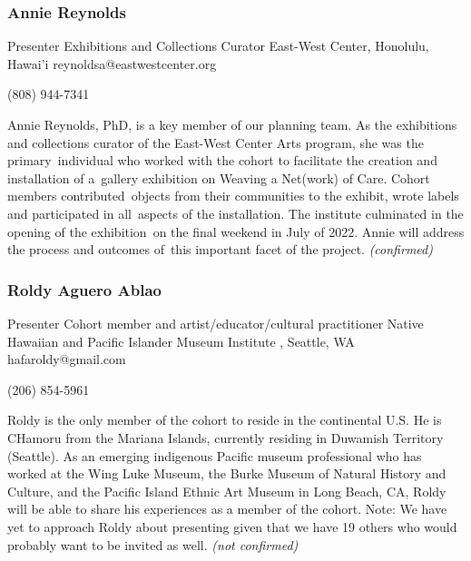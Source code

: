 \documentclass{report}
\begin{document}
              
                \subsubsection*{ Annie Reynolds }
                Presenter\newline
                Exhibitions and Collections Curator\newline
                East-West Center, Honolulu, Hawai'i
                \newline
                reynoldsa@eastwestcenter.org\newline
                
                (808) 944-7341\newline

                Annie Reynolds, PhD, is a key member of our planning team. As the exhibitions and collections curator of the East-West Center Arts program, she was the primary individual who worked with the cohort to facilitate the creation and installation of a gallery exhibition on Weaving a Net(work) of Care. Cohort members contributed objects from their communities to the exhibit, wrote labels and participated in all aspects of the installation. The institute culminated in the opening of the exhibition on the final weekend in July of 2022. Annie will address the process and outcomes of this important facet of the project.
                \emph{ (confirmed) }
              

              
                \subsubsection*{ Roldy Aguero  Ablao }
                Presenter\newline
                 Cohort member and artist/educator/cultural practitioner \newline
                 Native Hawaiian and Pacific Islander Museum Institute , Seattle, WA
                \newline
                hafaroldy@gmail.com\newline
                
                (206) 854-5961\newline

                Roldy is the only member of the cohort to reside in the continental U.S. He is CHamoru from the Mariana Islands, currently residing in Duwamish Territory (Seattle). As an emerging indigenous Pacific museum professional who has worked at the Wing Luke Museum, the Burke Museum of Natural History and Culture, and the Pacific Island Ethnic Art Museum in Long Beach, CA, Roldy will be able to share his experiences as a member of the cohort. Note: We have yet to approach Roldy about presenting given that we have 19 others who would probably want to be invited as well.
                \emph{ (not confirmed) }
              
\end{document}
